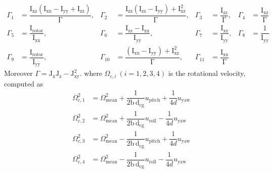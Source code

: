 \documentclass[3p]{elsarticle}
\begin{document}
\begin{equation}
    \begin{aligned}
        \Gamma_1 &= \dfrac{\mathrm{I}_{\text{xz}}\left(\mathrm{I}_{\text{xx}} - \mathrm{I}_{\text{yy}} + \mathrm{I}_{\text{zz}}\right)}{\mathrm{\Gamma}}, & \Gamma_2 &= \dfrac{\mathrm{I}_{\text{zz}}\left(\mathrm{I}_{\text{zz}} - \mathrm{I}_{\text{yy}}\right)+\mathrm{I}_{\text{xz}}^2}{\mathrm{\Gamma}}, & \Gamma_3 &= \dfrac{\mathrm{I}_{\text{zz}}}{\mathrm{\Gamma}}, & \Gamma_4 &= \dfrac{\mathrm{I}_{\text{xz}}}{\mathrm{\Gamma}} \\
        \Gamma_5 &= \dfrac{\mathrm{I}_{\text{rotor}}}{\mathrm{I}_{\text{xx}}}, & \Gamma_6 &= \dfrac{\mathrm{I}_{\text{zz}}-\mathrm{I}_{\text{xx}}}{\mathrm{I}_{\text{yy}}}, & \Gamma_7 &= \dfrac{\mathrm{I}_{\text{xz}}}{\mathrm{I}_{\text{yy}}}, & \Gamma_8 &= \dfrac{1}{\mathrm{I}_{\text{yy}}} \\
        \Gamma_9 &= \dfrac{\mathrm{I}_{\text{rotor}}}{\mathrm{I}_{\text{yy}}}, & \Gamma_{10} &= \dfrac{\left(\mathrm{I}_{\text{xx}}-\mathrm{I}_{\text{yy}}\right)+\mathrm{I}_{\text{xz}}^2}{\mathrm{\Gamma}}, & \Gamma_{11} &= \dfrac{\mathrm{I}_{\text{xx}}}{\mathrm{\Gamma}} & &
    \end{aligned}
\end{equation}
Moreover $\Gamma = \mathrm{J}_{\text{x}}\mathrm{J}_{\text{z}} - \mathrm{J}_{\text{xy}}^2$.
where $\Omega_{c, i}~(i=1, 2, 3, 4)$ is the rotational velocity, computed as
 \begin{align}
    \Omega_{c, 1}^2 &= \Omega_{\text{mean}}^2 + \dfrac{1}{2\mathrm{b\,d}_{\text{cg}}}u_{\text{pitch}} + \dfrac{1}{4d}u_{\text{yaw}} \\
    \Omega_{c, 2}^2 &= \Omega_{\text{mean}}^2 + \dfrac{1}{2\mathrm{b\,d}_{\text{cg}}}u_{\text{roll}} - \dfrac{1}{4d}u_{\text{yaw}}\\
    \Omega_{c, 3}^2 &= \Omega_{\text{mean}}^2 - \dfrac{1}{2\mathrm{b\,d}_{\text{cg}}}u_{\text{pitch}} + \dfrac{1}{4d}u_{\text{yaw}} \\
    \Omega_{c, 4}^2 &= \Omega_{\text{mean}}^2 - \dfrac{1}{2\mathrm{b\,d}_{\text{cg}}}u_{\text{roll}} - \dfrac{1}{4d}u_{\text{yaw}}
\end{align}
\end{document}
